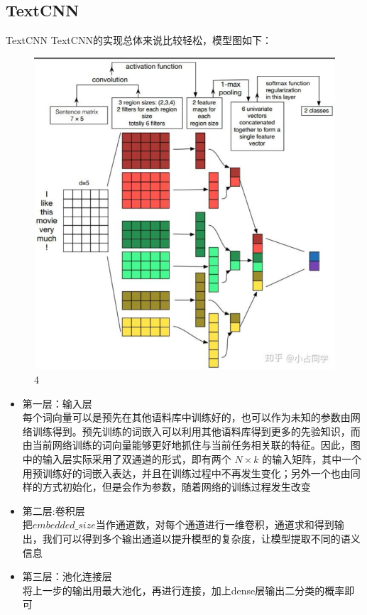 \documentclass[UTF8]{ctexbeamer}
\begin{document}
\subsection{TextCNN}
\begin{frame}[allowframebreaks]{TextCNN}
TextCNN的实现总体来说比较轻松，模型图如下：
\begin{figure}[H] %
	\centering %
	\includegraphics[scale=0.2]{textcnn_model.jpg} %
	\caption{4}
\end{figure}
\begin{itemize}
	\item 第一层：输入层\\
	每个词向量可以是预先在其他语料库中训练好的，也可以作为未知的参数由网络训练得到。预先训练的词嵌入可以利用其他语料库得到更多的先验知识，而由当前网络训练的词向量能够更好地抓住与当前任务相关联的特征。因此，图中的输入层实际采用了双通道的形式，即有两个 $N\times k$ 的输入矩阵，其中一个用预训练好的词嵌入表达，并且在训练过程中不再发生变化；另外一个也由同样的方式初始化，但是会作为参数，随着网络的训练过程发生改变
	\item 第二层:卷积层\\
	把$embedded\_size$当作通道数，对每个通道进行一维卷积，通道求和得到输出，我们可以得到多个输出通道以提升模型的复杂度，让模型提取不同的语义信息
	\item 第三层：池化连接层\\	
	将上一步的输出用最大池化，再进行连接，加上dense层输出二分类的概率即可
\end{itemize}
\end{frame}
\end{document}
